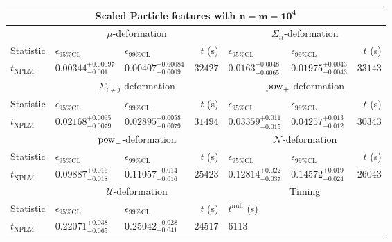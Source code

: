 \begin{tabular}{l|llr|llr}
	\toprule
	\multicolumn{7}{c}{{\bf Scaled Particle features with $\mathbf{n=m=10^{4}}$}} \\
	\toprule
	\multicolumn{1}{c}{} & \multicolumn{3}{c}{$\mu$-deformation} & \multicolumn{3}{c}{$\Sigma_{ii}$-deformation} \\
	Statistic & $\epsilon_{95\%\mathrm{CL}}$ & $\epsilon_{99\%\mathrm{CL}}$ & $t$ (s) & $\epsilon_{95\%\mathrm{CL}}$ & $\epsilon_{99\%\mathrm{CL}}$ & $t$ (s) \\
	\midrule
	$t_{\mathrm{NPLM}}$ & $0.00344_{-0.001}^{+0.00097}$ & $0.00407_{-0.0009}^{+0.00084}$ & $32427$ & $0.0163_{-0.0065}^{+0.0048}$ & $0.01975_{-0.0043}^{+0.0043}$ & $33143$ \\
	\toprule
	\multicolumn{1}{c}{} & \multicolumn{3}{c}{$\Sigma_{i\neq j}$-deformation} & \multicolumn{3}{c}{$\rm{pow}_{+}$-deformation} \\
	Statistic & $\epsilon_{95\%\mathrm{CL}}$ & $\epsilon_{99\%\mathrm{CL}}$ & $t$ (s) & $\epsilon_{95\%\mathrm{CL}}$ & $\epsilon_{99\%\mathrm{CL}}$ & $t$ (s) \\
	\midrule
	$t_{\mathrm{NPLM}}$ & $0.02168_{-0.0079}^{+0.0095}$ & $0.02895_{-0.0079}^{+0.0058}$ & $31494$ & $0.03359_{-0.015}^{+0.011}$ & $0.04257_{-0.012}^{+0.013}$ & $30343$ \\
	\toprule
	\multicolumn{1}{c}{} & \multicolumn{3}{c}{$\rm{pow}_{-}$-deformation} & \multicolumn{3}{c}{$\mathcal{N}$-deformation} \\
	Statistic & $\epsilon_{95\%\mathrm{CL}}$ & $\epsilon_{99\%\mathrm{CL}}$ & $t$ (s) & $\epsilon_{95\%\mathrm{CL}}$ & $\epsilon_{99\%\mathrm{CL}}$ & $t$ (s) \\
	\midrule
	$t_{\mathrm{NPLM}}$ & $0.09887_{-0.018}^{+0.016}$ & $0.11057_{-0.016}^{+0.014}$ & $25423$ & $0.12814_{-0.037}^{+0.022}$ & $0.14572_{-0.024}^{+0.019}$ & $26043$ \\
	\toprule
	\multicolumn{1}{c}{} & \multicolumn{3}{c}{$\mathcal{U}$-deformation} & \multicolumn{3}{c}{Timing} \\
	Statistic & $\epsilon_{95\%\mathrm{CL}}$ & $\epsilon_{99\%\mathrm{CL}}$ & $t$ (s) & $t^{\mathrm{null}}$ (s) \\
	\midrule
	$t_{\mathrm{NPLM}}$ & $0.22071_{-0.065}^{+0.038}$ & $0.25042_{-0.041}^{+0.028}$ & $24517$ & $6113$ \\
	\bottomrule
\end{tabular}